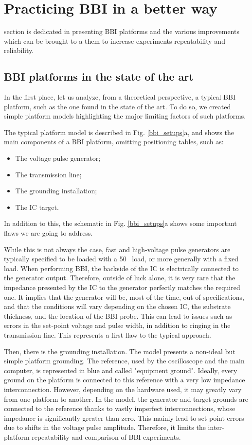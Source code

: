 
\section{Practicing BBI in a better way}
	 section is dedicated in presenting BBI platforms and the various improvements which can be brought to a them to increase experiments repeatability and reliability.
	\subsection{BBI platforms in the state of the art}
		In the first place, let us analyze, from a theoretical perspective, a typical BBI platform, such as the one found in the state of the art.
		To do so, we created simple platform models highlighting the major limiting factors of such platforms.
		
		The typical platform model is described in Fig. \ref{bbi_setups}a, and shows the main components of a BBI platform, omitting positioning tables, such as:
		\begin{itemize}
			\item The voltage pulse generator;
			\item The transmission line;
			\item The grounding installation;
			\item The IC target.
		\end{itemize}
		In addition to this, the schematic in Fig. \ref{bbi_setups}a shows some important flaws we are going to address.

		While this is not always the case, fast and high-voltage pulse generators are typically specified to be loaded with a 50 \textOmega\ load, or more generally with a fixed load.
		When performing BBI, the backside of the IC is electrically connected to the generator output.
		Therefore, outside of luck alone, it is very rare that the impedance presented by the IC to the generator perfectly matches the required one.
		It implies that the generator will be, most of the time, out of specifications, and that the conditions will vary depending on the chosen IC, the substrate thickness, and the location of the BBI probe.
		This can lead to issues such as errors in the set-point voltage and pulse width, in addition to ringing in the transmission line.
		This represents a first flaw to the typical approach.

		Then, there is the grounding installation.
		The model presents a non-ideal but simple platform grounding.
		The reference, used by the oscilloscope and the main computer, is represented in blue and called "equipment ground".
		Ideally, every ground on the platform is connected to this reference with a very low impedance interconnection.
		However, depending on the hardware used, it may greatly vary from one platform to another.
		In the model, the generator and target grounds are connected to the reference thanks to vastly imperfect interconnections, whose impedance is significantly greater than zero.
		This mainly lead to set-point errors due to shifts in the voltage pulse amplitude.
		Therefore, it limits the inter-platform repeatability and comparison of BBI experiments.

